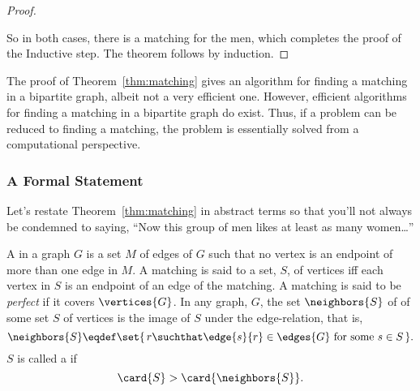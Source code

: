 \begin{proof}
\begin{description}
\iffalse
We can also match the rest of the men by induction if we show that
  the matching condition holds for the remaining men and women.  To
  check the matching condition for the remaining people, consider an
  arbitrary subset of the remaining men $X' \subseteq (M - X)$, and
  let $Y'$ be the set of remaining women that they like.  We must show
  that $\card{X'} \leq \card{Y'}$.  Originally, the combined set of
  men $X \cup X'$ liked the set of women $Y \cup Y'$.  So, by the
  matching condition, we know:
%
  \begin{equation*}
  \card{X \cup X'}  \leq  \card{Y \cup Y'}
  \end{equation*}
%
  We sent away $\card{X}$ men from the set on the left (leaving $X'$)
  and sent away an equal number of women from the set on the right
  (leaving $Y'$).  Therefore, it must be that $\card{X'} \leq
  \card{Y'}$ as claimed.
\fi

\end{description}

So in both cases, there is a matching for the men, which completes the
proof of the Inductive step.  The theorem follows by induction.
\end{proof}

The proof of Theorem~\ref{thm:matching} gives an algorithm for finding
a matching in a bipartite graph, albeit not a very efficient one.
However, efficient algorithms for finding a matching in a bipartite
graph do exist.  Thus, if a problem can be reduced to finding a
matching, the problem is essentially solved from a computational
perspective.

\subsubsection{A Formal Statement}

Let's restate Theorem~\ref{thm:matching} in abstract terms so that
you'll not always be condemned to saying, ``Now this group of men
likes at least as many women\dots''

\begin{definition}\label{def:5K}
 A  in a graph $G$ is a set $M$
of edges of $G$ such that no vertex is an endpoint of more than one
edge in $M$.  A matching is said to  
 a set, $S$, of vertices iff each vertex in $S$ is
an endpoint of an edge of the matching.  A matching is said to be
\emph{perfect}  if it covers
$\vertices{G}$.  In any graph, $G$, the set $\neighbors{S}$ of  of
some set $S$ of vertices is the image of $S$ under the edge-relation,
\iffalse set of all vertices adjacent to some vertex in $S$.  \fi that
is,
\[
\neighbors{S} \eqdef \set{\,r \suchthat \edge{s}{r} \in \edges{G} \text{ for
    some } s \in S\,}.
\]
$S$ is called a  if
\[
\card{S} > \card{\neighbors{S}}.
\]
\end{definition}

